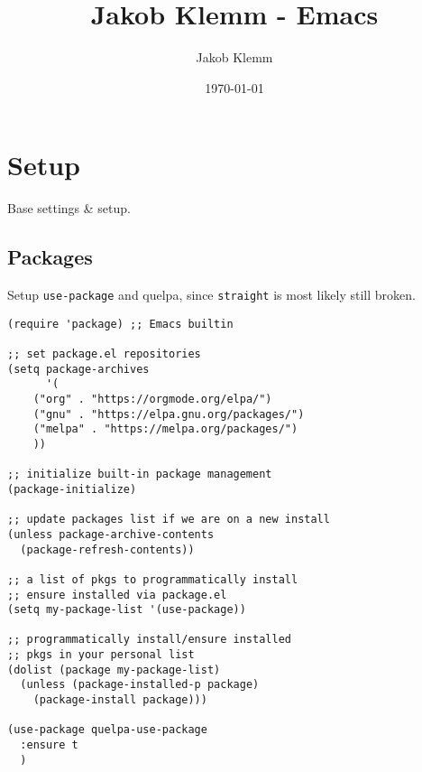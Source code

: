 \documentclass[11pt]{article}
\author{Jakob Klemm}
\date{\today}
\title{Jakob Klemm - Emacs}
\begin{document}
\maketitle
\tableofcontents


\section{Setup}
\label{sec:org8197699}
Base settings \& setup.
\subsection{Packages}
\label{sec:org8fab436}
Setup \texttt{use-package} and quelpa, since \texttt{straight} is most likely still
broken.
\begin{verbatim}
(require 'package) ;; Emacs builtin

;; set package.el repositories
(setq package-archives
      '(
	("org" . "https://orgmode.org/elpa/")
	("gnu" . "https://elpa.gnu.org/packages/")
	("melpa" . "https://melpa.org/packages/")
	))

;; initialize built-in package management
(package-initialize)

;; update packages list if we are on a new install
(unless package-archive-contents
  (package-refresh-contents))

;; a list of pkgs to programmatically install
;; ensure installed via package.el
(setq my-package-list '(use-package))

;; programmatically install/ensure installed
;; pkgs in your personal list
(dolist (package my-package-list)
  (unless (package-installed-p package)
    (package-install package)))

(use-package quelpa-use-package
  :ensure t
  )
\end{verbatim}
\end{document}
